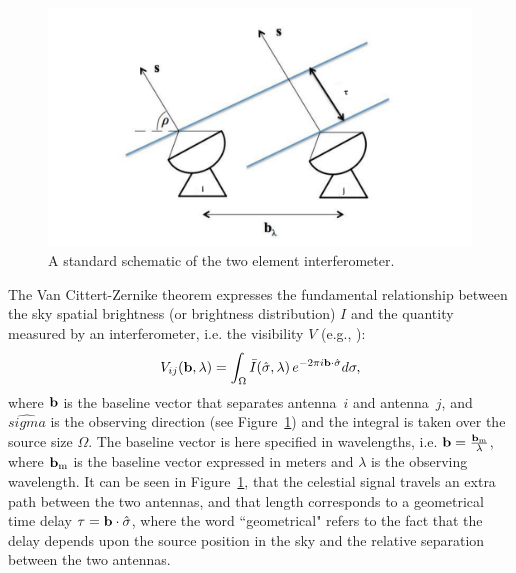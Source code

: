 \begin{figure}[]
\begin{center}
\includegraphics[width=1.\textwidth]{Bernardi/2_element_interferometer}
\end{center}
\caption{A standard schematic of the two element interferometer.}
\label{fig:fig1}
\end{figure}

The Van Cittert-Zernike theorem expresses the fundamental relationship between the sky spatial brightness (or brightness distribution) $I$ and the quantity measured by an interferometer, i.e. the visibility $V$ (e.g., \cite{TMS}):
\begin{equation}
V_{ij} ({\bf b}, \lambda) = \int_\Omega {\bar I} (\hat{\sigma}, \lambda) \, e^{-2 \pi i {\bf b} \cdot {\hat \sigma}} d {\bf \sigma},
\label{eq:1}
\end{equation}
where ${\bf b}$ is the baseline vector that separates antenna~$i$ and antenna~$j$, and $\hat{sigma}$ is the observing direction (see Figure~\ref{fig:fig1}) and the integral is taken over the source size $\Omega$. The baseline vector is here specified in wavelengths, i.e. ${\bf b} = \frac{{\bf b_{\rm m}}}{\lambda}$, where ${\bf b_{\rm m}}$ is the baseline vector expressed in meters and $\lambda$ is the observing wavelength. It can be seen in Figure~\ref{fig:fig1}, that the celestial signal travels an extra path between the two antennas, and that length corresponds to a geometrical time delay $\tau = {\bf b} \cdot {\hat \sigma}$, where the word ``geometrical" refers to the fact that the delay depends upon the source position in the sky and the relative separation between the two antennas.


